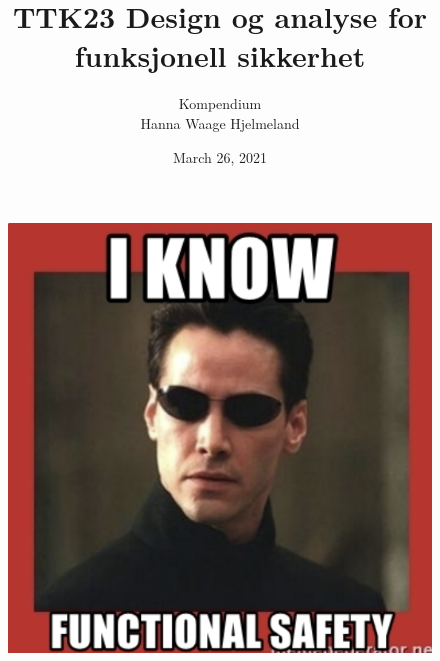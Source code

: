 \documentclass[11pt, a4paper, USenglish]{article} %
\begin{document}
\title{TTK23 Design og analyse for funksjonell sikkerhet}
\author{Kompendium\\
Hanna Waage Hjelmeland}
\date{March 26, 2021}
\begin{titlepage}
    \maketitle
    \begin{figure}[h]
    \centering
        \includegraphics[width=\textwidth]{figures/FaultBasics/robot.png}\\   
    \end{figure}

   \thispagestyle{empty}
\end{titlepage}

%
\newpage
\newpage
\tableofcontents
{}
\thispagestyle{empty}

\newpage
\setcounter{page}{1}













\newpage
\printbibliography
\label{sec:bibliography}
\end{document}

